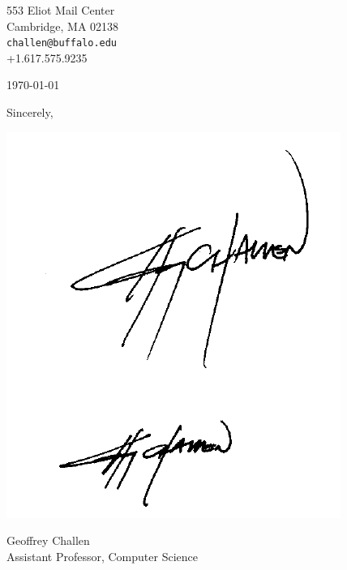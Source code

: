 

\def\shorttitle{}
\def\shortauthors{Geoffrey Challen}


\pagestyle{letter}

553 Eliot Mail Center\\
Cambridge, MA 02138\\
\texttt{challen@buffalo.edu}\\
+1.617.575.9235

\vspace*{0.1in}

\today

\vspace*{0.1in}



\vspace*{0.1in}

Sincerely,


\vspace*{-0.1in}
\includegraphics{./figs/LargeSig.pdf}
\vspace*{-0.1in}


Geoffrey Challen\\
Assistant Professor, Computer Science


